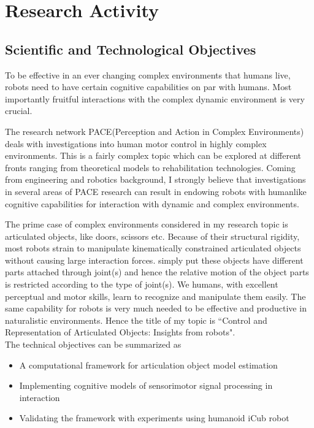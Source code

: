 \documentclass[12pt,a4paper]{report}
\begin{document}
\section{Research Activity}
\subsection{Scientific and Technological Objectives}

To be effective in an ever changing complex environments that humans live, robots need to have certain cognitive capabilities on par with humans. Most importantly fruitful interactions with the complex dynamic environment is very crucial. 

The research network PACE(Perception and Action in Complex Environments) deals with investigations into human motor control in highly complex environments. This is a fairly complex topic which can be explored at different fronts ranging from theoretical models to rehabilitation technologies. Coming from engineering and robotics background, I strongly believe that investigations in several areas of PACE research can result in endowing robots with humanlike cognitive capabilities for interaction with dynamic and complex environments. 

The prime case of complex environments considered in my research topic is articulated objects, like doors, scissors etc. Because of their structural rigidity, most robots strain to manipulate kinematically constrained articulated objects without causing large interaction forces. simply put these objects have different parts attached through joint(s) and hence the relative motion of the object parts is restricted according to the type of joint(s). We humans, with excellent perceptual and motor skills, learn to recognize and manipulate them easily. The same capability for robots is very much needed to be effective and productive in naturalistic environments. Hence the title of my topic is ``Control and Representation of Articulated Objects: Insights from robots". \\

The technical objectives can be summarized as 
\begin{itemize}
	\item A computational framework for articulation object model estimation
	\item Implementing cognitive models of sensorimotor signal processing in interaction 
	\item Validating the framework with experiments using humanoid iCub robot
\end{itemize}
\end{document}
